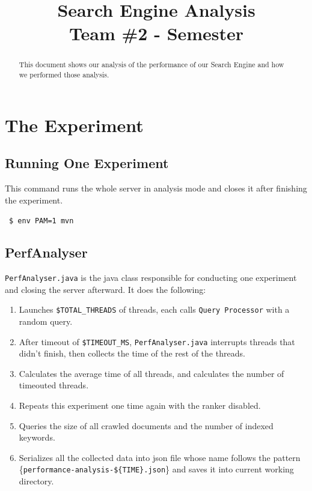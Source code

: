 \documentclass[12pt]{IEEEtran}
\title{\textbf{Search Engine Analysis}\\Team \#2 - Semester}
\date{}
\begin{document}

\maketitle

\begin{abstract}
  This document shows our analysis of the performance of our Search Engine and how we performed those analysis.
\end{abstract}

\section{The Experiment}
\subsection{Running One Experiment}
This command runs the whole server in analysis mode and closes it after finishing the experiment. 

~\texttt{\$ env PAM=1 mvn}

\subsection{PerfAnalyser}
\texttt{PerfAnalyser.java} is the java class responsible for conducting one experiment and closing the server afterward. 
It does the following:
\begin{enumerate}
  \item Launches \small\texttt{\$TOTAL\_THREADS} of threads, each calls \small\texttt{Query Processor} with a random query.
  \item After timeout of \small\texttt{\$TIMEOUT\_MS}, \small\texttt{PerfAnalyser.java} interrupts threads that didn't finish, then collects the time of the rest of the threads.
  \item Calculates the average time of all threads, and calculates the number of timeouted threads.
  \item Repeats this experiment one time again with the ranker disabled.
  \item Queries the size of all crawled documents and the number of indexed keywords.
  \item Serializes all the collected data into json file whose name follows the pattern \small\{\texttt{performance-analysis-\$\{TIME\}.json}\} and saves it into current working directory.
\end{enumerate}
\end{document}
